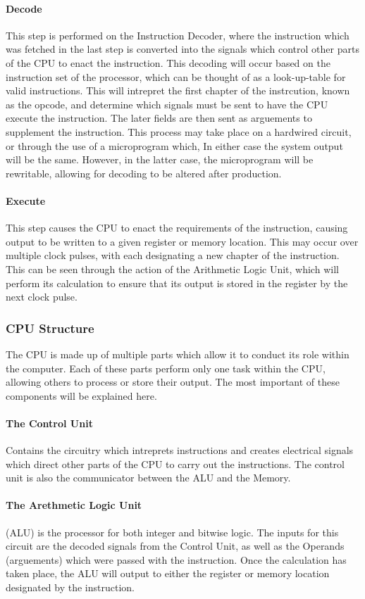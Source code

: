 \documentclass[a4paper,11pt]{report}
\begin{document}
				\paragraph{Decode}
					This step is performed on the Instruction Decoder, where the instruction which was fetched in the last step is converted into the signals which control other parts of the CPU to enact the instruction. 
					This decoding will occur based on the instruction set of the processor, which can be thought of as a look-up-table for valid instructions. 
					This will intrepret the first chapter of the instrcution, known as the opcode, and determine which signals must be sent to have the CPU execute the instruction. 
					The later fields are then sent as arguements to supplement the instruction. 
					This process may take place on a hardwired circuit, or through the use of a microprogram which, In either case the system output will be the same. 
					However, in the latter case, the microprogram will be rewritable, allowing for decoding to be altered after production. 
				\paragraph{Execute}
					This step causes the CPU to enact the requirements of the instruction, causing output to be written to a given register or memory location. 
					This may occur over multiple clock pulses, with each designating a new chapter of the instruction. 
					This can be seen through the action of the Arithmetic Logic Unit, which will perform its calculation to ensure that its output is stored in the register by the next clock pulse. 
			\subsubsection{CPU Structure}
				The CPU is made up of multiple parts which allow it to conduct its role within the computer. 
				Each of these parts perform only one task within the CPU, allowing others to process or store their output. 
				The most important of these components will be explained here. 
				\paragraph{The Control Unit}
					Contains the circuitry which intreprets instructions and creates electrical signals which direct other parts of the CPU to carry out the instructions. 
					The control unit is also the communicator between the ALU and the Memory.
				\paragraph{The Arethmetic Logic Unit}
					(ALU) is the processor for both integer and bitwise logic. 
					The inputs for this circuit are the decoded signals from the Control Unit, as well as the Operands (arguements) which were passed with the instruction. 
					Once the calculation has taken place, the ALU will output to either the register or memory location designated by the instruction. 
\end{document}

